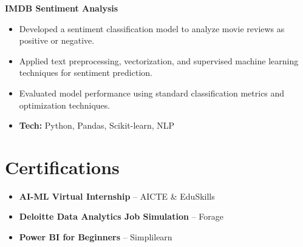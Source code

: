 \documentclass[letterpaper,11pt]{article}
\begin{document}
\vspace{2pt}

\textbf{IMDB Sentiment Analysis}

\begin{itemize}[leftmargin=1.2em,noitemsep,topsep=1pt]
\item Developed a sentiment classification model to analyze movie reviews as positive or negative.
\item Applied text preprocessing, vectorization, and supervised machine learning techniques for sentiment prediction.
\item Evaluated model performance using standard classification metrics and optimization techniques.
\item \textbf{Tech:} Python, Pandas, Scikit-learn, NLP
\end{itemize}

\section{Certifications}

\begin{itemize}[leftmargin=1.2em,noitemsep,topsep=1pt]
\item \textbf{AI-ML Virtual Internship} -- AICTE \& EduSkills
\item \textbf{Deloitte Data Analytics Job Simulation} -- Forage
\item \textbf{Power BI for Beginners} -- Simplilearn
\end{itemize}
\end{document}
